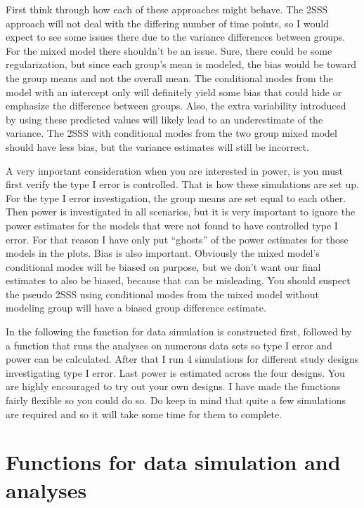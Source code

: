 \documentclass[
]{book}
\begin{document}
First think through how each of these approaches might behave. The 2SSS approach will not deal with the differing number of time points, so I would expect to see some issues there due to the variance differences between groups. For the mixed model there shouldn't be an issue. Sure, there could be some regularization, but since each group's mean is modeled, the bias would be toward the group means and not the overall mean. The conditional modes from the model with an intercept only will definitely yield some bias that could hide or emphasize the difference between groups. Also, the extra variability introduced by using these predicted values will likely lead to an underestimate of the variance. The 2SSS with conditional modes from the two group mixed model should have less bias, but the variance estimates will still be incorrect.

A very important consideration when you are interested in power, is you must first verify the type I error is controlled. That is how these simulations are set up. For the type I error investigation, the group means are set equal to each other. Then power is investigated in all scenarios, but it is very important to ignore the power estimates for the models that were not found to have controlled type I error. For that reason I have only put ``ghosts'' of the power estimates for those models in the plots. Bias is also important. Obviously the mixed model's conditional modes will be biased on purpose, but we don't want our final estimates to also be biased, because that can be misleading. You should suspect the pseudo 2SSS using conditional modes from the mixed model without modeling group will have a biased group difference estimate.

In the following the function for data simulation is constructed first, followed by a function that runs the analyses on numerous data sets so type I error and power can be calculated. After that I run 4 simulations for different study designs investigating type I error. Last power is estimated across the four designs. You are highly encouraged to try out your own designs. I have made the functions fairly flexible so you could do so. Do keep in mind that quite a few simulations are required and so it will take some time for them to complete.

\hypertarget{functions-for-data-simulation-and-analyses}{%
\section{Functions for data simulation and analyses}\label{functions-for-data-simulation-and-analyses}}
\end{document}

